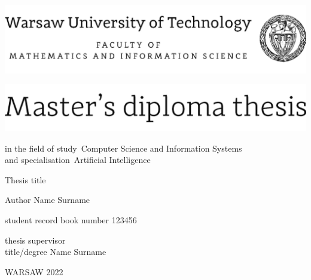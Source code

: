 \documentclass[12pt,twoside,a4paper]{article}
\newcommand{\discipline}{Computer Science and Information Systems}
\renewcommand{\title}{Thesis title}
\newcommand{\supervisor}{title/degree Name Surname}
\newcommand{\spec}{Artificial Intelligence}
\renewcommand{\year}{2022}
\newcommand{\authori}{Author Name Surname}
\newcommand{\albumi}{123456}
\begin{document}
\pagestyle{empty}


\begin{center}
\includegraphics[scale=1.]{img/wut}
\vspace{40pt}


\includegraphics[scale=1.]{img/master} %

{ \arial
in the field of study~\discipline 
\\
and specialisation~\spec

\vspace{30pt}
{\arial \large \title}


\vspace{40pt}

{\arial \huge \authori }

\vspace{5pt}

student record book number \albumi


\vspace{40pt}

thesis supervisor \\
{\arial \supervisor}


\vfill
 
WARSAW \year \\
}
\end{center}


%
%
\end{document}
